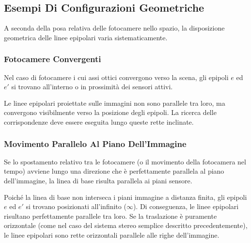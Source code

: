 ﻿\documentclass[11pt, a4paper]{article}
\begin{document}
\newpage

\subsection{Esempi Di Configurazioni Geometriche}

A seconda della posa relativa delle fotocamere nello spazio, la disposizione geometrica delle linee epipolari varia sistematicamente.

\subsubsection{Fotocamere Convergenti}

Nel caso di fotocamere i cui assi ottici convergono verso la scena, gli epipoli $e$ ed $e'$ si trovano all'interno o in prossimità dei sensori attivi.


Le linee epipolari proiettate sulle immagini non sono parallele tra loro, ma convergono visibilmente verso la posizione degli epipoli. La ricerca delle corrispondenze deve essere eseguita lungo queste rette inclinate.

\subsubsection{Movimento Parallelo Al Piano Dell'Immagine}

Se lo spostamento relativo tra le fotocamere (o il movimento della fotocamera nel tempo) avviene lungo una direzione che è perfettamente parallela al piano dell'immagine, la linea di base risulta parallela ai piani sensore.


Poiché la linea di base non interseca i piani immagine a distanza finita, gli epipoli $e$ ed $e'$ si trovano posizionati all'infinito ($\infty$). Di conseguenza, le linee epipolari risultano perfettamente parallele tra loro. Se la traslazione è puramente orizzontale (come nel caso del sistema stereo semplice descritto precedentemente), le linee epipolari sono rette orizzontali parallele alle righe dell'immagine.
\end{document}
